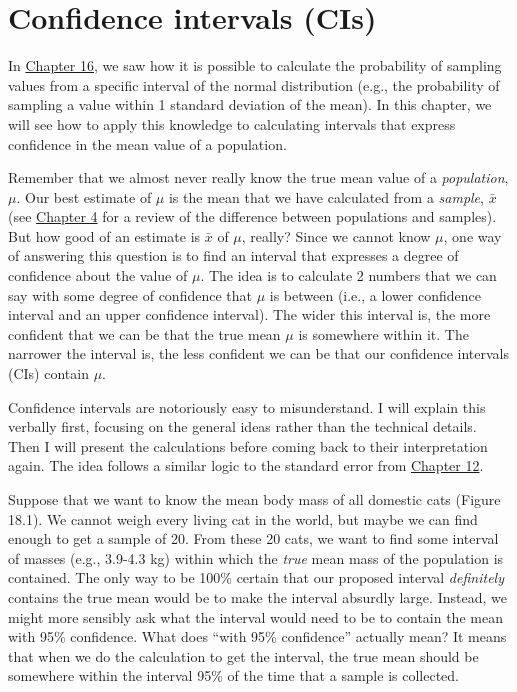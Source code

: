 \documentclass[
]{scrbook}
\begin{document}
\hypertarget{Chapter_18}{%
\chapter{Confidence intervals (CIs)}\label{Chapter_18}}

In \protect\hyperlink{Chapter_16}{Chapter 16}, we saw how it is possible to calculate the probability of sampling values from a specific interval of the normal distribution (e.g., the probability of sampling a value within 1 standard deviation of the mean).
In this chapter, we will see how to apply this knowledge to calculating intervals that express confidence in the mean value of a population.

Remember that we almost never really know the true mean value of a \emph{population}, \(\mu\).
Our best estimate of \(\mu\) is the mean that we have calculated from a \emph{sample}, \(\bar{x}\) (see \protect\hyperlink{Chapter_4}{Chapter 4} for a review of the difference between populations and samples).
But how good of an estimate is \(\bar{x}\) of \(\mu\), really?
Since we cannot know \(\mu\), one way of answering this question is to find an interval that expresses a degree of confidence about the value of \(\mu\).
The idea is to calculate 2 numbers that we can say with some degree of confidence that \(\mu\) is between (i.e., a lower confidence interval and an upper confidence interval).
The wider this interval is, the more confident that we can be that the true mean \(\mu\) is somewhere within it.
The narrower the interval is, the less confident we can be that our confidence intervals (CIs) contain \(\mu\).

Confidence intervals are notoriously easy to misunderstand.
I will explain this verbally first, focusing on the general ideas rather than the technical details.
Then I will present the calculations before coming back to their interpretation again.
The idea follows a similar logic to the standard error from \protect\hyperlink{Chapter_12}{Chapter 12}.

Suppose that we want to know the mean body mass of all domestic cats (Figure 18.1).
We cannot weigh every living cat in the world, but maybe we can find enough to get a sample of 20.
From these 20 cats, we want to find some interval of masses (e.g., 3.9-4.3 kg) within which the \emph{true} mean mass of the population is contained.
The only way to be 100\% certain that our proposed interval \emph{definitely} contains the true mean would be to make the interval absurdly large.
Instead, we might more sensibly ask what the interval would need to be to contain the mean with 95\% confidence.
What does ``with 95\% confidence'' actually mean?
It means that when we do the calculation to get the interval, the true mean should be somewhere within the interval 95\% of the time that a sample is collected.
\end{document}
